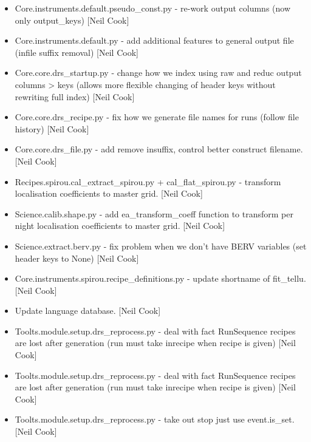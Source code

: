 \documentclass[a4paper,10pt,english]{report}
\begin{document}
\begin{itemize}
\item {} 
Core.instruments.default.pseudo\_const.py - re-work output columns (now
only output\_keys) {[}Neil Cook{]}

\item {} 
Core.instruments.default.py - add additional features to general
output file (infile suffix removal) {[}Neil Cook{]}

\item {} 
Core.core.drs\_startup.py - change how we index using raw and reduc
output columns \textendash{}\textgreater{} keys (allows more flexible changing of header keys
without rewriting full index) {[}Neil Cook{]}

\item {} 
Core.core.drs\_recipe.py - fix how we generate file names for runs
(follow file history) {[}Neil Cook{]}

\item {} 
Core.core.drs\_file.py - add remove insuffix, control better construct
filename. {[}Neil Cook{]}

\item {} 
Recipes.spirou.cal\_extract\_spirou.py + cal\_flat\_spirou.py - transform
localisation coefficients to master grid. {[}Neil Cook{]}

\item {} 
Science.calib.shape.py - add ea\_transform\_coeff function to transform
per night localisation coefficients to master grid. {[}Neil Cook{]}

\item {} 
Science.extract.berv.py - fix problem when we don’t have BERV
variables (set header keys to None) {[}Neil Cook{]}

\item {} 
Core.instruments.spirou.recipe\_definitions.py - update shortname of
fit\_tellu. {[}Neil Cook{]}

\item {} 
Update language database. {[}Neil Cook{]}

\item {} 
Toolts.module.setup.drs\_reprocess.py - deal with fact RunSequence
recipes are lost after generation (run must take inrecipe when recipe
is given) {[}Neil Cook{]}

\item {} 
Toolts.module.setup.drs\_reprocess.py - deal with fact RunSequence
recipes are lost after generation (run must take inrecipe when recipe
is given) {[}Neil Cook{]}

\item {} 
Toolts.module.setup.drs\_reprocess.py - take out stop just use
event.is\_set. {[}Neil Cook{]}


\end{itemize}
\end{document}
